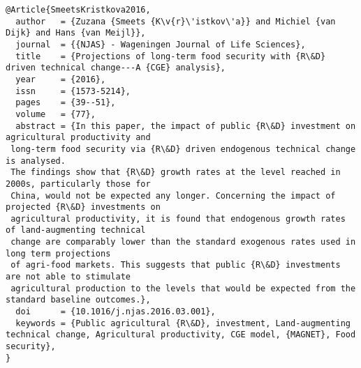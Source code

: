 \documentclass[11pt,letterpaper]{report}
\begin{document}
\begin{verbatim}
@Article{SmeetsKristkova2016,
  author   = {Zuzana {Smeets {K\v{r}\'istkov\'a}} and Michiel {van Dijk} and Hans {van Meijl}},
  journal  = {{NJAS} - Wageningen Journal of Life Sciences},
  title    = {Projections of long-term food security with {R\&D} driven technical change---A {CGE} analysis},
  year     = {2016},
  issn     = {1573-5214},
  pages    = {39--51},
  volume   = {77},
  abstract = {In this paper, the impact of public {R\&D} investment on agricultural productivity and
 long-term food security via {R\&D} driven endogenous technical change is analysed.
 The findings show that {R\&D} growth rates at the level reached in 2000s, particularly those for
 China, would not be expected any longer. Concerning the impact of projected {R\&D} investments on
 agricultural productivity, it is found that endogenous growth rates of land-augmenting technical
 change are comparably lower than the standard exogenous rates used in long term projections
 of agri-food markets. This suggests that public {R\&D} investments are not able to stimulate
 agricultural production to the levels that would be expected from the standard baseline outcomes.},
  doi      = {10.1016/j.njas.2016.03.001},
  keywords = {Public agricultural {R\&D}, investment, Land-augmenting technical change, Agricultural productivity, CGE model, {MAGNET}, Food security},
} 
\end{verbatim}
\end{document}
